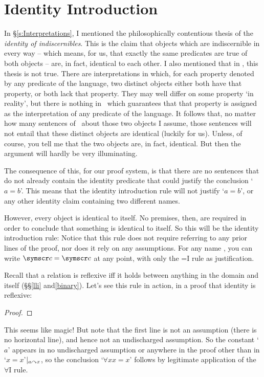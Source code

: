 \section{Identity Introduction}\label{idint}
In §\ref{s:Interpretations}, I mentioned the philosophically contentious thesis of the \emph{identity of indiscernibles}. This is the claim that objects which are indiscernible in every way – which means, for us, that exactly the same predicates are true of both objects – are, in fact, identical to each other. I also mentioned that in \FOL, this thesis is not true. There are interpretations in which, for each property denoted by any predicate of the language, two distinct objects either both have that property, or both lack that property. They may well differ on some property `in reality', but there is nothing in \FOL\ which guarantees that that property is assigned as the interpretation of any predicate of the language. 
It follows that, no matter how many sentences of \FOL\ about those two objects I assume, those sentences will not entail that these distinct objects are identical (luckily for us). Unless, of course, you tell me that the two objects are, in fact, identical. But then the argument will hardly be very illuminating.

The consequence of this, for our proof system, is that there are no sentences that do not already contain the identity predicate that could justify the conclusion `$a=b$'. This means that the identity introduction rule will not justify `$a=b$', or any other identity claim containing two different names.

However, every object is identical to itself. No premises, then, are required in order to conclude that something is identical to itself. So this will be the identity introduction rule:
Notice that this rule does not require referring to any prior lines of the proof, nor does it rely on any assumptions. For any name , you can write $\meta{c}=\meta{c}$ at any point, with only the {=}I rule as justification. 

Recall that a relation is reflexive iff it holds between anything in the domain and itself (§§\ref{lli} and\ref{binary}). Let's see this rule in action, in a proof that identity is reflexive:
\begin{proof}
	\idi{}
\end{proof} This seems like magic! But note that the first line is not an assumption (there is no horizontal line), and hence not an undischarged assumption. So the constant `$a$' appears in no undischarged assumption or anywhere in the proof other than in `$x=x$'$\vert_{a\curvearrowright x}$, so the conclusion `$\forall x x=x$' follows by legitimate application of the $\forall$I rule.


